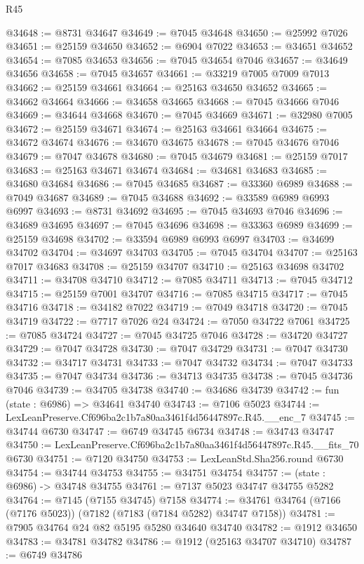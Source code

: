 \begin{lexlean}{R45}
\begin{coremodule}
{@34648 := @8731 @34647
@34649 := @7045 @34648
@34650 := @25992 @7026
@34651 := @25159 @34650
@34652 := @6904 @7022
@34653 := @34651 @34652
@34654 := @7085 @34653
@34656 := @7045 @34654 @7046
@34657 := @34649 @34656
@34658 := @7045 @34657
@34661 := @33219 @7005 @7009 @7013
@34662 := @25159 @34661
@34664 := @25163 @34650 @34652
@34665 := @34662 @34664
@34666 := @34658 @34665
@34668 := @7045 @34666 @7046
@34669 := @34644 @34668
@34670 := @7045 @34669
@34671 := @32980 @7005
@34672 := @25159 @34671
@34674 := @25163 @34661 @34664
@34675 := @34672 @34674
@34676 := @34670 @34675
@34678 := @7045 @34676 @7046
@34679 := @7047 @34678
@34680 := @7045 @34679
@34681 := @25159 @7017
@34683 := @25163 @34671 @34674
@34684 := @34681 @34683
@34685 := @34680 @34684
@34686 := @7045 @34685
@34687 := @33360 @6989
@34688 := @7049 @34687
@34689 := @7045 @34688
@34692 := @33589 @6989 @6993 @6997
@34693 := @8731 @34692
@34695 := @7045 @34693 @7046
@34696 := @34689 @34695
@34697 := @7045 @34696
@34698 := @33363 @6989
@34699 := @25159 @34698
@34702 := @33594 @6989 @6993 @6997
@34703 := @34699 @34702
@34704 := @34697 @34703
@34705 := @7045 @34704
@34707 := @25163 @7017 @34683
@34708 := @25159 @34707
@34710 := @25163 @34698 @34702
@34711 := @34708 @34710
@34712 := @7085 @34711
@34713 := @7045 @34712
@34715 := @25159 @7001 @34707
@34716 := @7085 @34715
@34717 := @7045 @34716
@34718 := @34182 @7022
@34719 := @7049 @34718
@34720 := @7045 @34719
@34722 := @7717 @7026 @24
@34724 := @7050 @34722 @7061
@34725 := @7085 @34724
@34727 := @7045 @34725 @7046
@34728 := @34720 @34727
@34729 := @7047 @34728
@34730 := @7047 @34729
@34731 := @7047 @34730
@34732 := @34717 @34731
@34733 := @7047 @34732
@34734 := @7047 @34733
@34735 := @7047 @34734
@34736 := @34713 @34735
@34738 := @7045 @34736 @7046
@34739 := @34705 @34738
@34740 := @34686 @34739
@34742 := fun (state : @6986) => @34641 @34740
@34743 := @7106 @5023
@34744 := LexLeanPreserve.Cf696ba2c1b7a80aa3461f4d56447897c.R45.__enc_7
@34745 := @34744 @6730
@34747 := @6749 @34745 @6734
@34748 := @34743 @34747
@34750 := LexLeanPreserve.Cf696ba2c1b7a80aa3461f4d56447897c.R45.__fits_70 @6730
@34751 := @7120 @34750
@34753 := LexLeanStd.Sha256.round @6730
@34754 := @34744 @34753
@34755 := @34751 @34754
@34757 := (state : @6986) -> @34748 @34755
@34761 := @7137 @5023 @34747 @34755 @5282
@34764 := @7145 (@7155 @34745) @7158
@34774 := @34761 @34764 (@7166 (@7176 @5023)) (@7182 (@7183 (@7184 @5282) @34747 @7158))
@34781 := @7905 @34764 @24 @82 @5195 @5280 @34640 @34740
@34782 := @1912 @34650
@34783 := @34781 @34782
@34786 := @1912 (@25163 @34707 @34710)
@34787 := @6749 @34786
}
\end{coremodule}
\end{lexlean}

